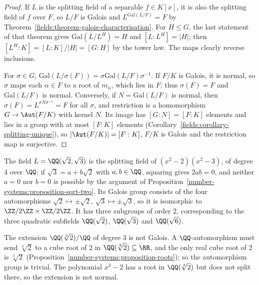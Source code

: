 \begin{proof}
If $L$ is the splitting field of a separable $f \in K[x]$, it is also the splitting field of
$f$ over $F$, so $L/F$ is Galois and $L^{\mathrm{Gal}(L/F)} = F$ by
Theorem~\ref{fields:theorem-galois-characterisation}. For $H \leq G$, the last statement of
that theorem gives $\mathrm{Gal}(L/L^H) = H$ and $[L : L^H] = |H|$; then
$[L^H : K] = [L : K]/|H| = [G : H]$ by the tower law. The maps clearly reverse inclusions.

For $\sigma \in G$, $\mathrm{Gal}(L/\sigma(F)) = \sigma\mathrm{Gal}(L/F)\sigma^{-1}$. If $F/K$ is Galois, it is
normal, so $\sigma$ maps each $\alpha \in F$ to a root of $m_\alpha$, which lies in $F$; thus
$\sigma(F) = F$ and $\mathrm{Gal}(L/F)$ is normal. Conversely, if $N = \mathrm{Gal}(L/F)$ is normal, then
$\sigma(F) = L^{\sigma N \sigma^{-1}} = F$ for all $\sigma$, and restriction is a homomorphism
$G \to \Aut(F/K)$ with kernel $N$. Its image has $[G : N] = [F : K]$ elements and lies in a
group with at most $[F : K]$ elements (Corollary~\ref{fields:corollary-splitting-unique}), so
$|\Aut(F/K)| = [F : K]$, $F/K$ is Galois and the restriction map is surjective.
\end{proof}

\begin{example}\label{fields:example-biquadratic}
The field $L = \QQ(\sqrt 2, \sqrt 3)$ is the splitting field of $(x^2 - 2)(x^2 - 3)$, of degree $4$
over $\QQ$: if $\sqrt 3 = a + b\sqrt 2$ with $a, b \in \QQ$, squaring gives $2ab = 0$, and neither
$a = 0$ nor $b = 0$ is possible by the argument of
Proposition~\ref{number-systems:proposition-sqrt-two}. Its Galois group consists of the four
automorphisms $\sqrt 2 \mapsto \pm\sqrt 2$, $\sqrt 3 \mapsto \pm\sqrt 3$, so it is isomorphic to
$\ZZ/2\ZZ \times \ZZ/2\ZZ$. It has three subgroups of order $2$, corresponding to the three
quadratic subfields $\QQ(\sqrt 2)$, $\QQ(\sqrt 3)$ and $\QQ(\sqrt 6)$.
\end{example}

\begin{counterexample}\label{fields:counterexample-not-galois}
The extension $\QQ(\sqrt[3]{2})/\QQ$ of degree $3$ is not Galois. A $\QQ$-automorphism must send
$\sqrt[3]{2}$ to a cube root of $2$ in $\QQ(\sqrt[3]{2}) \subseteq \RR$, and the only real cube root of
$2$ is $\sqrt[3]{2}$ (Proposition~\ref{number-systems:proposition-roots}); so the automorphism
group is trivial. The polynomial $x^3 - 2$ has a root in $\QQ(\sqrt[3]{2})$ but does not split
there, so the extension is not normal.
\end{counterexample}

